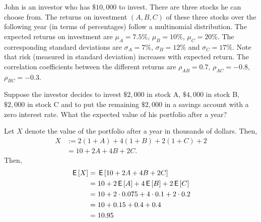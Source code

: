 \documentclass[lectures]{subfiles}
\begin{document}
John is an investor who has $\$ 10,000$ to invest.
There are three stocks he can choose from.
The returns on investment $(A,B,C)$ of these three stocks over the following year (in terms of percentages) follow a multinomial distribution.
The expected returns on investment are $\mu_A = 7.5 \%$, $\mu_B = 10\%$, $\mu_C = 20\%$.
The corresponding standard deviations are $\sigma_A = 7\%$, $\sigma_B = 12 \%$ and $\sigma_C = 17\%$.
Note that risk (measured in standard deviation) increases with expected return.
The correlation coefficients between the different returns are $\rho_{AB} = 0.7$, $\rho_{AC} = -0.8$, $\rho_{BC} = -0.3$.

\begin{exercise}
Suppose the investor decides to invest $\$ 2,000$ in stock A, $\$4,000$ in stock B, $\$2,000$ in stock C and to put the remaining $\$ 2,000$ in a savings account with a zero interest rate. What the expected value of his portfolio after a year?
\begin{solution}
Let $X$ denote the value of the portfolio after a year in thousands of dollars. Then,
\begin{align}
    X &:= 2(1 + A) + 4(1 + B) + 2(1 + C) + 2 \\
    &= 10 + 2A + 4B + 2C.
\end{align}
Then,
\begin{align}
    \,\mathsf{E}\left[X\right] &= \,\mathsf{E}\left[ 10 + 2A + 4B + 2C \right] \\
    &= 10 + 2\,\mathsf{E}\left[A\right] + 4\,\mathsf{E}\left[B\right] + 2\,\mathsf{E}\left[C\right] \\
    &= 10 + 2\cdot 0.075  + 4 \cdot 0.1  + 2 \cdot 0.2 \\
    &= 10 + 0.15  + 0.4  + 0.4 \\
    &= 10.95
\end{align}
\end{solution}
\end{exercise}
\end{document}
